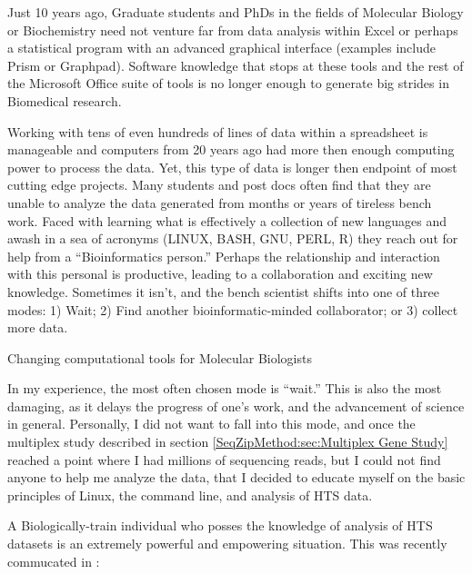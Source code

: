     Just 10 years ago, Graduate students and PhDs in the fields of Molecular Biology or Biochemistry need not venture far from data analysis within Excel or perhaps a statistical program with an advanced graphical interface (examples include Prism or Graphpad). Software knowledge that stops at these tools and the rest of the Microsoft Office suite of tools is no longer enough to generate big strides in Biomedical research.

    Working with tens of even hundreds of lines of data within a spreadsheet is manageable and computers from 20 years ago had more then enough computing power to process the data. Yet, this type of data is longer then endpoint of most cutting edge projects. Many students and post docs often find that they are unable to analyze the data generated from months or years of tireless bench work. Faced with learning what is effectively a collection of new languages and awash in a sea of acronyms (LINUX, BASH, GNU, PERL, R) they reach out for help from a ``Bioinformatics person.'' Perhaps the relationship and interaction with this personal is productive, leading to a collaboration and exciting new knowledge. Sometimes it isn't, and the bench scientist shifts into one of three modes: 1) Wait; 2) Find another bioinformatic-minded collaborator; or 3) collect more data.

\begin{table} %
  \caption[Changing computational tools for Molecular Biologists] 
    {
     Changing computational tools for Molecular Biologists
     }
   \label{Disc:tab:Comp tools for Molecular Biology}
   
   \end{table}

    In my experience, the most often chosen mode is ``wait.'' This is also the most damaging, as it delays the progress of one's work, and the advancement of science in general. Personally, I did not want to fall into this mode, and once the multiplex study described in section \ref{SeqZipMethod:sec:Multiplex Gene Study} reached a point where I had millions of sequencing reads, but I could not find anyone to help me analyze the data, that I decided to educate myself on the basic principles of Linux, the command line, and analysis of HTS data.

    A Biologically-train individual who posses the knowledge of analysis of HTS datasets is an extremely powerful and empowering situation. This was recently commucated in \citet{Plocik2013}:

